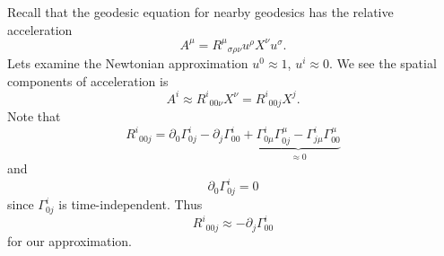 
Recall that the geodesic equation for nearby geodesics has the
relative acceleration
\begin{equation}
A^{\mu} = {R^{\mu}}_{\sigma\rho\nu}u^{\rho}X^{\nu}u^{\sigma}.
\end{equation}
Lets examine the Newtonian approximation $u^{0}\approx 1$, $u^{i}\approx0$.
We see the spatial components of acceleration is
\begin{equation}\label{eq:spatialComponentsOfAcceleration}
A^{i}\approx {R^{i}}_{00\nu}X^{\nu}={R^{i}}_{00j}X^{j}.
\end{equation}
Note that
\begin{equation}
{R^{i}}_{00j}=\partial_{0}\Gamma^{i}_{0j}-\partial_{j}\Gamma^{i}_{00}
+\underbrace{\Gamma^{i}_{0\mu}\Gamma^{\mu}_{0j}-\Gamma^{i}_{j\mu}\Gamma^{\mu}_{00}}_{\approx0}
\end{equation}
and
\begin{equation}
\partial_{0}\Gamma^{i}_{0j}=0
\end{equation}
since $\Gamma^{i}_{0j}$ is time-independent. Thus
\begin{equation}
{R^{i}}_{00j}\approx-\partial_{j}\Gamma^{i}_{00}
\end{equation}
for our approximation.

